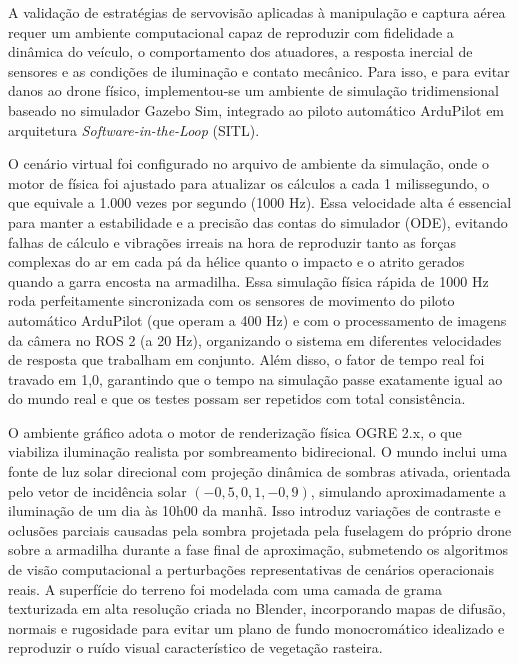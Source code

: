 
A validação de estratégias de servovisão aplicadas à manipulação e captura aérea requer um ambiente computacional capaz de reproduzir com fidelidade a dinâmica do veículo, o comportamento dos atuadores, a resposta inercial de sensores e as condições de iluminação e contato mecânico. Para isso, e para evitar danos ao drone físico, implementou-se um ambiente de simulação tridimensional baseado no simulador Gazebo Sim, integrado ao piloto automático ArduPilot em arquitetura \textit{Software-in-the-Loop} (SITL).

O cenário virtual foi configurado no arquivo de ambiente da simulação, onde o motor de física foi ajustado para atualizar os cálculos a cada 1 milissegundo, o que equivale a 1.000 vezes por segundo (1000 Hz). Essa velocidade alta é essencial para manter a estabilidade e a precisão das contas do simulador (ODE), evitando falhas de cálculo e vibrações irreais na hora de reproduzir tanto as forças complexas do ar em cada pá da hélice quanto o impacto e o atrito gerados quando a garra encosta na armadilha. Essa simulação física rápida de 1000 Hz roda perfeitamente sincronizada com os sensores de movimento do piloto automático ArduPilot (que operam a 400 Hz) e com o processamento de imagens da câmera no ROS 2 (a 20 Hz), organizando o sistema em diferentes velocidades de resposta que trabalham em conjunto. Além disso, o fator de tempo real foi travado em 1,0, garantindo que o tempo na simulação passe exatamente igual ao do mundo real e que os testes possam ser repetidos com total consistência.

O ambiente gráfico adota o motor de renderização física OGRE 2.x, o que viabiliza iluminação realista por sombreamento bidirecional. O mundo inclui uma fonte de luz solar direcional com projeção dinâmica de sombras ativada, orientada pelo vetor de incidência solar $(-0,5, 0,1, -0,9)$, simulando aproximadamente a iluminação de um dia às 10h00 da manhã. Isso introduz variações de contraste e oclusões parciais causadas pela sombra projetada pela fuselagem do próprio drone sobre a armadilha durante a fase final de aproximação, submetendo os algoritmos de visão computacional a perturbações representativas de cenários operacionais reais. A superfície do terreno foi modelada com uma camada de grama texturizada em alta resolução criada no Blender, incorporando mapas de difusão, normais e rugosidade para evitar um plano de fundo monocromático idealizado e reproduzir o ruído visual característico de vegetação rasteira.


